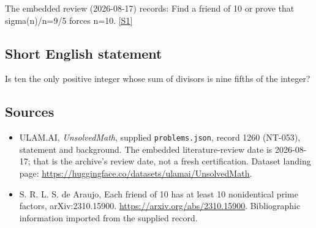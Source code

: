\documentclass[11pt,a4paper]{article}
\newcommand{\sref}[2]{\hyperlink{source:#1:#2}{[S#2]}}
\begin{document}
The embedded review (2026-08-17) records: Find a friend of 10 or prove that sigma(n)/n=9/5 forces n=10. \sref{1260}{1}

\subsection{Short English statement}

Is ten the only positive integer whose sum of divisors is nine fifths of the integer?

\subsection{Sources}

{\small

\begin{itemize}

\item[\hypertarget{source:1260:1}{S1}] ULAM.AI, \emph{UnsolvedMath}, supplied \texttt{problems.json}, record 1260 (NT-053), statement and background. The embedded literature-review date is 2026-08-17; that is the archive’s review date, not a fresh certification. Dataset landing page: \url{https://huggingface.co/datasets/ulamai/UnsolvedMath}.

\item[\hypertarget{source:1260:2}{S2}] S. R. L. S. de Araujo, Each friend of 10 has at least 10 nonidentical prime factors, arXiv:2310.15900. \url{https://arxiv.org/abs/2310.15900}. Bibliographic information imported from the supplied record.

\end{itemize}

}

\label{end:1260}
\end{document}
